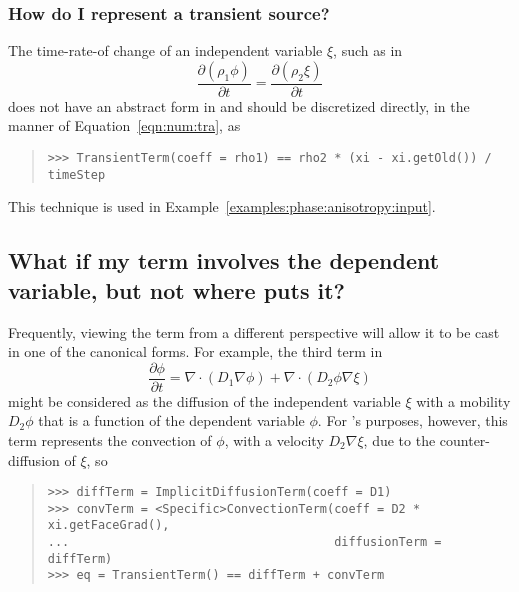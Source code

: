                 \subsubsection{How do I represent a transient source?}
                    The time-rate-of change of an independent variable
                    $\xi$, such as in
                    \[
                        \frac{\partial (\rho_1 \phi)}{\partial t}
                        = \frac{\partial (\rho_2 \xi)}{\partial t}
                    \]
                    does not have an abstract form in \FiPy{} and
                    should be discretized directly, in the manner of
                    Equation~\eqref{eqn:num:tra}, as
                    \begin{quote}
\begin{verbatim}
>>> TransientTerm(coeff = rho1) == rho2 * (xi - xi.getOld()) / timeStep
\end{verbatim}
                    \end{quote}
                    This technique is used in
                    Example~\ref{examples:phase:anisotropy:input}.
                    
        \subsection{What if my term involves the dependent variable, 
            but not where \FiPy{} puts it?}
            
            Frequently, viewing the term from a different perspective
            will allow it to be cast in one of the canonical forms.
            For example, the third term in
            \[
                \frac{\partial \phi}{\partial t} 
                = \nabla\cdot\left( D_1 \nabla \phi\right)
                + \nabla\cdot\left( D_2 \phi \nabla \xi\right)
            \]
            might be considered as the diffusion of the independent
            variable $\xi$ with a mobility $D_2\phi$ that is a
            function of the dependent variable $\phi$.  For \FiPy{}'s
            purposes, however, this term represents the convection of
            $\phi$, with a velocity $D_2\nabla\xi$, due to the
            counter-diffusion of $\xi$, so
            \begin{quote}
\begin{verbatim}
>>> diffTerm = ImplicitDiffusionTerm(coeff = D1)
>>> convTerm = <Specific>ConvectionTerm(coeff = D2 * xi.getFaceGrad(), 
...                                     diffusionTerm = diffTerm)
>>> eq = TransientTerm() == diffTerm + convTerm
\end{verbatim}
            \end{quote}

